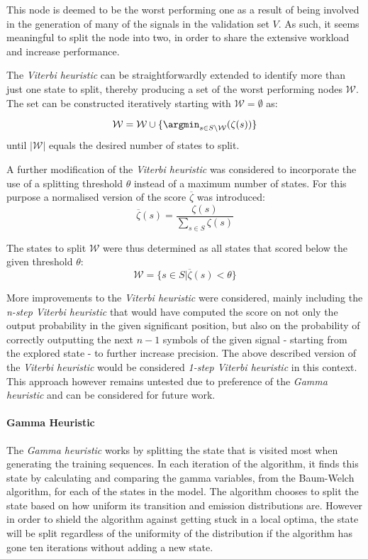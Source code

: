 This node is deemed to be the worst performing one as a result of being involved in the generation of many of the signals in the validation set $V$. As such, it seems meaningful to split the node into two, in order to share the extensive workload and increase performance.

The \emph{Viterbi heuristic} can be straightforwardly extended to identify more than just one state to split, thereby producing a set of the worst performing nodes $\mathcal{W}$. The set can be constructed iteratively starting with $\mathcal{W} = \emptyset$ as:

$$\mathcal{W} = \mathcal{W} \cup \{\argmin_{s\in S\setminus \mathcal{W}}(\zeta(s))\}$$
until $|\mathcal{W}|$ equals the desired number of states to split.

A further modification of the \emph{Viterbi heuristic} was considered to incorporate the use of a splitting threshold $\theta$ instead of a maximum number of states. For this purpose a normalised version of the score $\overline{\zeta}$ was introduced:
$$\overline{\zeta}(s) = \frac{\zeta(s)}{\sum_{s\in S}\zeta(s)}$$

The states to split $\mathcal{W}$ were thus determined as all states that scored below the given threshold $\theta$:
$$\mathcal{W} = \{s\in S|\overline\zeta(s) < \theta\}$$

More improvements to the \emph{Viterbi heuristic} were considered, mainly including the \emph{n-step Viterbi heuristic} that would have computed the score on not only the output probability in the given significant position, but also on the probability of correctly outputting the next $n -1$ symbols of the given signal - starting from the explored state - to further increase precision. The above described version of the \emph{Viterbi heuristic} would be considered \emph{1-step Viterbi heuristic} in this context. This approach however remains untested due to preference of the \emph{Gamma heuristic} and can be considered for future work.

\paragraph{Gamma Heuristic}

The \emph{Gamma heuristic} works by splitting the state that is visited most when generating the 
training sequences.
In each iteration of the algorithm, it finds this state by calculating and comparing the gamma variables,
from the Baum-Welch algorithm, for each of the states in the model.
The algorithm chooses to split the state based on how uniform its transition and emission distributions are.
However in order to shield the algorithm against getting stuck in a local optima, the state will be split
regardless of the uniformity of the distribution if the algorithm has gone ten iterations without adding a
new state.

